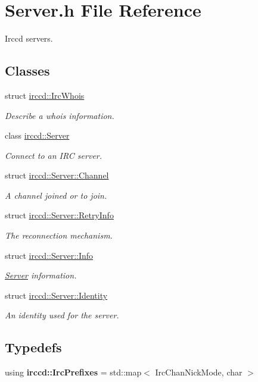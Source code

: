 \hypertarget{a00125}{\section{Server.\-h File Reference}
\label{a00125}
}


Irccd servers.  


\subsection*{Classes}
\begin{DoxyCompactItemize}
\item 
struct \hyperlink{a00036}{irccd\-::\-Irc\-Whois}
\begin{DoxyCompactList}\small\item\em Describe a whois information. \end{DoxyCompactList}\item 
class \hyperlink{a00055}{irccd\-::\-Server}
\begin{DoxyCompactList}\small\item\em Connect to an I\-R\-C server. \end{DoxyCompactList}\item 
struct \hyperlink{a00004}{irccd\-::\-Server\-::\-Channel}
\begin{DoxyCompactList}\small\item\em A channel joined or to join. \end{DoxyCompactList}\item 
struct \hyperlink{a00053}{irccd\-::\-Server\-::\-Retry\-Info}
\begin{DoxyCompactList}\small\item\em The reconnection mechanism. \end{DoxyCompactList}\item 
struct \hyperlink{a00031}{irccd\-::\-Server\-::\-Info}
\begin{DoxyCompactList}\small\item\em \hyperlink{a00055}{Server} information. \end{DoxyCompactList}\item 
struct \hyperlink{a00029}{irccd\-::\-Server\-::\-Identity}
\begin{DoxyCompactList}\small\item\em An identity used for the server. \end{DoxyCompactList}\end{DoxyCompactItemize}
\subsection*{Typedefs}
\begin{DoxyCompactItemize}
\item 
using {\bfseries irccd\-::\-Irc\-Prefixes} = std\-::map$<$ Irc\-Chan\-Nick\-Mode, char $>$
\end{DoxyCompactItemize}
